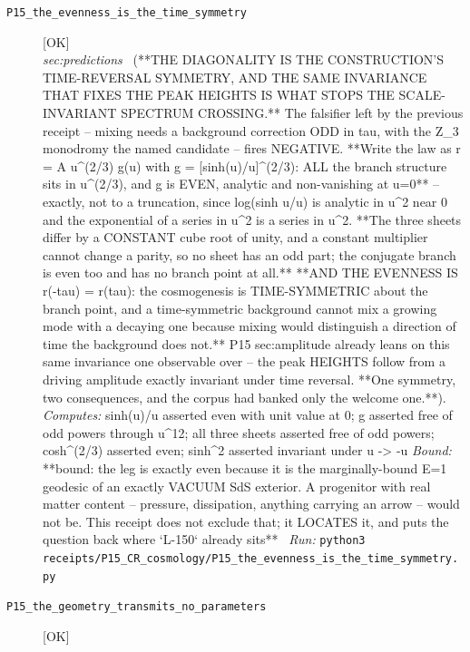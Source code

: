 \begin{description}
\item[\label{rcpt:P15_the_evenness_is_the_time_symmetry}\texttt{P15\_the\_evenness\_is\_the\_time\_symmetry}]\hfill\textsf{[OK]}\\
\textit{sec:predictions} \ (**THE DIAGONALITY IS THE CONSTRUCTION'S TIME-REVERSAL SYMMETRY, AND THE SAME INVARIANCE THAT FIXES THE PEAK HEIGHTS IS WHAT STOPS THE SCALE-INVARIANT SPECTRUM CROSSING.** The falsifier left by the previous receipt -- mixing needs a background correction ODD in tau, with the Z\_3 monodromy the named candidate -- fires NEGATIVE. **Write the law as r = A u\textasciicircum{}(2/3) g(u) with g = [sinh(u)/u]\textasciicircum{}(2/3): ALL the branch structure sits in u\textasciicircum{}(2/3), and g is EVEN, analytic and non-vanishing at u=0** -- exactly, not to a truncation, since log(sinh u/u) is analytic in u\textasciicircum{}2 near 0 and the exponential of a series in u\textasciicircum{}2 is a series in u\textasciicircum{}2. **The three sheets differ by a CONSTANT cube root of unity, and a constant multiplier cannot change a parity, so no sheet has an odd part; the conjugate branch is even too and has no branch point at all.** **AND THE EVENNESS IS r(-tau) = r(tau): the cosmogenesis is TIME-SYMMETRIC about the branch point, and a time-symmetric background cannot mix a growing mode with a decaying one because mixing would distinguish a direction of time the background does not.** P15 sec:amplitude already leans on this same invariance one observable over -- the peak HEIGHTS follow from a driving amplitude exactly invariant under time reversal. **One symmetry, two consequences, and the corpus had banked only the welcome one.**). 
\emph{Computes:} sinh(u)/u asserted even with unit value at 0; g asserted free of odd powers through u\textasciicircum{}12; all three sheets asserted free of odd powers; cosh\textasciicircum{}(2/3) asserted even; sinh\textasciicircum{}2 asserted invariant under u -> -u
 \emph{Bound:} **bound: the leg is exactly even because it is the marginally-bound E=1 geodesic of an exactly VACUUM SdS exterior. A progenitor with real matter content -- pressure, dissipation, anything carrying an arrow -- would not be. This receipt does not exclude that; it LOCATES it, and puts the question back where `L-150` already sits**
\ \emph{Run:} \texttt{python3 receipts/P15\_CR\_cosmology/P15\_the\_evenness\_is\_the\_time\_symmetry.py}
\item[\label{rcpt:P15_the_geometry_transmits_no_parameters}\texttt{P15\_the\_geometry\_transmits\_no\_parameters}]\hfill\textsf{[OK]}\\

\end{description}
